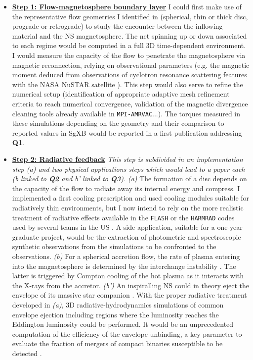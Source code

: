 \documentclass[letterpaper,12pt,onecolumn]{article}
\makeatletter
\newcommand{\sgx}{SgXB\xspace}
\newcommand*{\ns}{NS\@\xspace}
\newcommand*{\eg}{e.g.\@\xspace}
\makeatother
\begin{document}
\begin{itemize}[label={}]
\item \textbf{\underline{Step 1: Flow-magnetosphere boundary layer}} I could first make use of the representative flow geometries I identified in \citep{ElMellah2018} (spherical, thin or thick disc, prograde or retrograde) to study the encounter between the inflowing material and the \ns magnetosphere. The net spinning up or down associated to each regime would be computed in a full 3D time-dependent environment. I would measure the capacity of the flow to penetrate the magnetosphere via magnetic reconnection, relying on observational parameters (\eg the magnetic moment deduced from observations of cyclotron resonance scattering features with the NASA NuSTAR satellite \citep{Furst2014}). This step would also serve to refine the numerical setup (identification of appropriate adaptive mesh refinement criteria to reach numerical convergence, validation of the magnetic divergence cleaning tools already available in \texttt{MPI-AMRVAC}...). The torques measured in these simulations depending on the geometry and their comparison to reported values in \sgx would be reported in a first publication addressing \textbf{Q1}.
\item \textbf{\underline{Step 2: Radiative feedback}} \textit{This step is subdivided in an implementation step (a) and two physical applications steps which would lead to a paper each (b linked to \textbf{Q2} and b' linked to \textbf{Q3}).} \textit{(a)} The formation of a disc depends on the capacity of the flow to radiate away its internal energy and compress. I implemented a first cooling prescription and used cooling modules suitable for radiatively thin environments, but I now intend to rely on the more realistic treatment of radiative effects available in the \texttt{FLASH} or the \texttt{HARMRAD} codes used by several teams in the US \citep{McKinney2014}. A side application, suitable for a one-year graduate project, would be the extraction of photometric and spectroscopic synthetic observations from the simulations to be confronted to the observations. \textit{(b)} For a spherical accretion flow, the rate of plasma entering into the magnetosphere is determined by the interchange instability \citep{Shakura2012}. The latter is triggered by Compton cooling of the hot plasma as it interacts with the X-rays from the accretor. \textit{(b')} An inspiralling \ns could in theory eject the envelope of its massive star companion \citep{Kruckow2016}. With the proper radiative treatment developed in \textit{(a)}, 3D radiative-hydrodynamics simulations of common envelope ejection including regions where the luminosity reaches the Eddington luminosity could be performed. It would be an unprecedented computation of the efficiency of the envelope unbinding, a key parameter to evaluate the fraction of mergers of compact binaries susceptible to be detected \citep{Murguia-Berthier2017}.

\end{itemize}
\end{document}
